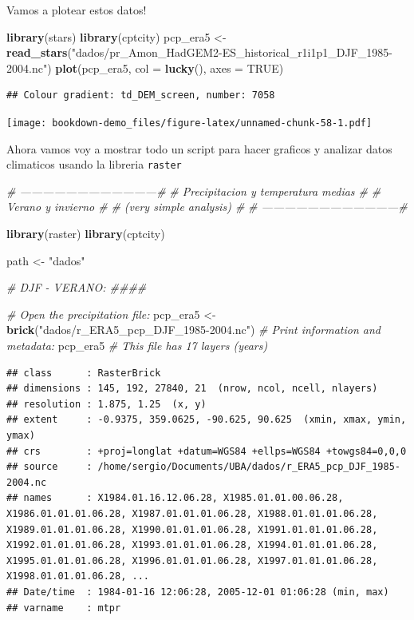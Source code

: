 \documentclass[]{book}
\newenvironment{Shaded}{\begin{snugshade}}{\end{snugshade}}
\newcommand{\CommentTok}[1]{\textcolor[rgb]{0.56,0.35,0.01}{\textit{#1}}}
\newcommand{\DataTypeTok}[1]{\textcolor[rgb]{0.13,0.29,0.53}{#1}}
\newcommand{\KeywordTok}[1]{\textcolor[rgb]{0.13,0.29,0.53}{\textbf{#1}}}
\newcommand{\NormalTok}[1]{#1}
\newcommand{\OtherTok}[1]{\textcolor[rgb]{0.56,0.35,0.01}{#1}}
\newcommand{\StringTok}[1]{\textcolor[rgb]{0.31,0.60,0.02}{#1}}
\begin{document}
Vamos a plotear estos datos!

\begin{Shaded}
\begin{Highlighting}[]
\KeywordTok{library}\NormalTok{(stars)}
\KeywordTok{library}\NormalTok{(cptcity)}
\NormalTok{pcp_era5 <-}\StringTok{ }\KeywordTok{read_stars}\NormalTok{(}\StringTok{"dados/pr_Amon_HadGEM2-ES_historical_r1i1p1_DJF_1985-2004.nc"}\NormalTok{)}
\KeywordTok{plot}\NormalTok{(pcp_era5,}
    \DataTypeTok{col =} \KeywordTok{lucky}\NormalTok{(),}
     \DataTypeTok{axes =} \OtherTok{TRUE}\NormalTok{)}
\end{Highlighting}
\end{Shaded}

\begin{verbatim}
## Colour gradient: td_DEM_screen, number: 7058
\end{verbatim}

\texttt{[image: bookdown-demo\_files/figure-latex/unnamed-chunk-58-1.pdf]}

Ahora vamos voy a mostrar todo un script para hacer graficos y analizar datos climaticos usando la libreria \texttt{raster}

\begin{Shaded}
\begin{Highlighting}[]
\CommentTok{# ------------------------------------#}
\CommentTok{# Precipitacion y temperatura medias  #}
\CommentTok{#         Verano y invierno           #}
\CommentTok{#       (very simple analysis)        #}
\CommentTok{# ------------------------------------#}

\KeywordTok{library}\NormalTok{(raster)}
\KeywordTok{library}\NormalTok{(cptcity)}

\NormalTok{path <-}\StringTok{ "dados"}

\CommentTok{# DJF - VERANO: ####}

\CommentTok{# Open the precipitation file:}
\NormalTok{pcp_era5 <-}\StringTok{ }\KeywordTok{brick}\NormalTok{(}\StringTok{"dados/r_ERA5_pcp_DJF_1985-2004.nc"}\NormalTok{)}
\CommentTok{# Print information and metadata:}
\NormalTok{pcp_era5 }\CommentTok{# This file has 17 layers (years)}
\end{Highlighting}
\end{Shaded}

\begin{verbatim}
## class      : RasterBrick 
## dimensions : 145, 192, 27840, 21  (nrow, ncol, ncell, nlayers)
## resolution : 1.875, 1.25  (x, y)
## extent     : -0.9375, 359.0625, -90.625, 90.625  (xmin, xmax, ymin, ymax)
## crs        : +proj=longlat +datum=WGS84 +ellps=WGS84 +towgs84=0,0,0 
## source     : /home/sergio/Documents/UBA/dados/r_ERA5_pcp_DJF_1985-2004.nc 
## names      : X1984.01.16.12.06.28, X1985.01.01.00.06.28, X1986.01.01.01.06.28, X1987.01.01.01.06.28, X1988.01.01.01.06.28, X1989.01.01.01.06.28, X1990.01.01.01.06.28, X1991.01.01.01.06.28, X1992.01.01.01.06.28, X1993.01.01.01.06.28, X1994.01.01.01.06.28, X1995.01.01.01.06.28, X1996.01.01.01.06.28, X1997.01.01.01.06.28, X1998.01.01.01.06.28, ... 
## Date/time  : 1984-01-16 12:06:28, 2005-12-01 01:06:28 (min, max)
## varname    : mtpr
\end{verbatim}
\end{document}

